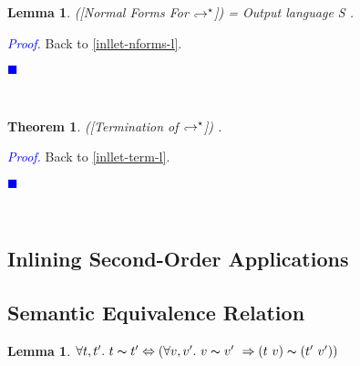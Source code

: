 \documentclass[a4paper,11pt,oneside]{article}
\theoremstyle{plain}
\newtheorem{lemma}[definition]{Lemma}
\newtheorem{theorem}[definition]{Theorem}
\renewenvironment{proof}{\noindent \textcolor{blue}{\textit{Proof.}}}
{{\begin{tiny}\textcolor{blue}{$\blacksquare$}\end{tiny}}\\}
\newcommand{\tmapp}[2]{(#1 ~ #2)}
\newcommand{\eqv}[1]{#1 \thicksim #1'}
\newcommand{\hookdownarrow}{\mathrel{\rotatebox[origin=c]{180}{$\hookleftarrow$}}}
\newcommand{\inlletarr}{\hookdownarrow}
\begin{document}
	
\begin{lemma}([Normal Forms For $\inlletarr^\star$]) = Output language S
 \label{inllet-nforms-p}.
\end{lemma}
\begin{proof}
Back to \ref{inllet-nforms-l}.
\end{proof}


\begin{theorem}([Termination of $\inlletarr^\star$])
\label{inllet-term-p}.
\end{theorem}
\begin{proof}
  Back to \ref{inllet-term-l}.
\end{proof}	
	
	
	
	\subsection{Inlining Second-Order Applications}



	\subsection{Semantic Equivalence Relation}
	\begin{lemma}
		$\forall t,t'.~ \eqv{t} \Leftrightarrow 
			(\forall v, v'.~\eqv{v}~\Rightarrow
			\tmapp{t}{v} \thicksim \tmapp{t'}{v'})$
	\label{equiv-def-p}
	\end{lemma}
\end{document}
